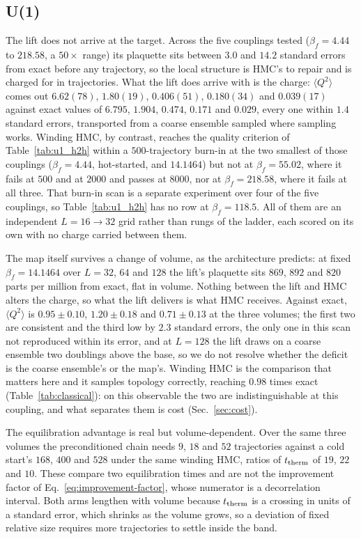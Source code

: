 \documentclass[prd, twocolumn, superscriptaddress, nofootinbib,floatfix]{revtex4-2}
\DeclareRobustCommand{\Eq}[1]{Eq.~\eqref{eq:#1}}
\DeclareRobustCommand{\sect}[1]{Sec.~\ref{sec:#1}}
\DeclareRobustCommand{\tb}[1]{Table~\ref{tab:#1}}
\begin{document}
\subsection{U(1)}
\label{sec:u1obs}
The lift does not arrive at the target. Across the five couplings tested
($\beta_f=4.44$ to $218.58$, a $50\times$ range) its plaquette sits between
$3.0$ and $14.2$ standard errors from exact before any trajectory, so the local
structure is HMC's to repair and is charged for in trajectories. What the lift
does arrive with is the charge: $\langle Q^2\rangle$ comes out $6.62(78)$,
$1.80(19)$, $0.406(51)$, $0.180(34)$ and $0.039(17)$ against exact values of
$6.795$, $1.904$, $0.474$, $0.171$ and $0.029$, every one within $1.4$ standard
errors, transported from a coarse ensemble sampled where sampling
works. Winding HMC, by contrast, reaches the quality criterion of \tb{u1_h2h}
within a $500$-trajectory burn-in at the two smallest of those couplings
($\beta_f=4.44$, hot-started, and $14.1464$) but not at $\beta_f=55.02$, where
it fails at $500$ and at $2000$ and passes at $8000$, nor at $\beta_f=218.58$,
where it fails at all three. That burn-in scan is a separate experiment over
four of the five couplings, so \tb{u1_h2h} has no row at $\beta_f=118.5$. All of
them are an independent
$L=16\to32$ grid rather than rungs of the ladder, each scored on its own with no
charge carried between them.

The map itself survives a change of volume, as the architecture predicts: at
fixed $\beta_f=14.1464$ over $L=32$, $64$ and $128$ the lift's plaquette
sits $869$, $892$ and $820$ parts per million from exact, flat in volume.
Nothing between the lift and HMC alters the charge, so what the lift delivers is
what HMC receives. Against exact,
$\langle Q^2\rangle$ is $0.95\pm0.10$, $1.20\pm0.18$ and $0.71\pm0.13$ at the
three volumes; the first two are consistent and the third low by $2.3$ standard
errors, the only one in this scan not reproduced within its error, and at
$L=128$ the lift draws on a coarse ensemble two doublings above the base, so we
do not resolve whether the deficit is the coarse ensemble's or the map's.
Winding HMC is the comparison that matters here and it samples topology
correctly, reaching $0.98$ times exact (\tb{classical}): on this observable the
two are indistinguishable at this coupling, and what separates them is cost
(\sect{cost}).

The equilibration advantage is real but volume-dependent. Over the same three
volumes the preconditioned chain needs $9$, $18$ and $52$ trajectories against a
cold start's $168$, $400$ and $528$ under the same winding HMC, ratios of
$t_{\rm therm}$ of $19$, $22$ and $10$. These compare two equilibration times
and are not the improvement factor of \Eq{improvement-factor}, whose numerator
is a decorrelation interval. Both arms lengthen with volume because $t_{\rm therm}$ is a crossing in units of a
standard error, which shrinks as the volume grows, so a deviation of fixed
relative size requires more trajectories to settle inside the band.
\end{document}
